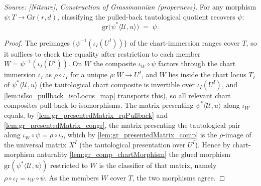 \begin{lemma}\leanok
  \label{lem:gr_grPointOfRankQuotient_rqPullback_tautological}
  \textit{Source: [Nitsure], Construction of Grassmannian (properness).}
  For any morphism \(\psi : T \to \mathrm{Gr}(r,d)\), classifying the pulled-back tautological
  quotient recovers \(\psi\):
  \[
    \mathrm{gr}\bigl(\psi^{*}\langle \mathcal{U}, u\rangle\bigr) \;=\; \psi .
  \]
\end{lemma}
\begin{proof}
  The preimages \(\{\psi^{-1}(\iota_I(U^I))\}\) of the chart-immersion ranges cover \(T\), so
  it suffices to check the equality after restriction to each member \(W = \psi^{-1}
  (\iota_I(U^I))\). On \(W\) the composite \(\iota_W\circ\psi\) factors through the chart
  immersion \(\iota_I\) as \(\rho\circ\iota_I\) for a unique \(\rho : W \to U^I\), and \(W\)
  lies inside the chart locus \(T_I\) of \(\psi^{*}\langle\mathcal{U},u\rangle\) (the
  tautological chart composite is invertible over \(\iota_I(U^I)\), and
  \cref{lem:isIso_pullback_isoLocus_map} transports this), so all relevant chart composites
  pull back to isomorphisms. The matrix presenting \(\psi^{*}\langle\mathcal{U},u\rangle\)
  along \(\iota_W\) equals, by \cref{lem:gr_presentedMatrix_rqPullback} and
  \cref{lem:gr_presentedMatrix_congr}, the matrix presenting the tautological pair along
  \(\iota_W\circ\psi = \rho\circ\iota_I\), which by \cref{lem:gr_presentedMatrix_comp} is the
  \(\rho\)-image of the universal matrix \(X^I\) (the tautological presentation over \(U^I\)).
  Hence by chart-morphism naturality \cref{lem:gr_comp_chartMorphism} the glued morphism
  \(\mathrm{gr}(\psi^{*}\langle\mathcal{U},u\rangle)\) restricted to \(W\) is the classifier of
  that matrix, namely \(\rho\circ\iota_I = \iota_W\circ\psi\). As the members \(W\) cover
  \(T\), the two morphisms agree.
\end{proof}

